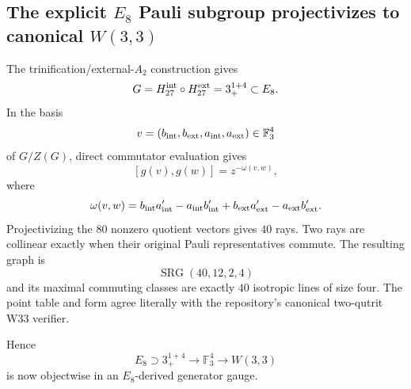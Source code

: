 \subsection*{The explicit $E_8$ Pauli subgroup projectivizes to canonical $W(3,3)$}
The trinification/external-$A_2$ construction gives
\[
G=H_{27}^{\rm int}\circ H_{27}^{\rm ext}=3_+^{1+4}\subset E_8.
\]
In the basis
\[
v=(b_{\rm int},b_{\rm ext},a_{\rm int},a_{\rm ext})\in\mathbb F_3^4
\]
of \(G/Z(G)\), direct commutator evaluation gives
\[
[g(v),g(w)]=z^{-\omega(v,w)},
\]
where
\[
\omega(v,w)=b_{\rm int}a'_{\rm int}-a_{\rm int}b'_{\rm int}
+b_{\rm ext}a'_{\rm ext}-a_{\rm ext}b'_{\rm ext}.
\]
Projectivizing the \(80\) nonzero quotient vectors gives \(40\) rays. Two rays are collinear exactly when their original Pauli representatives commute. The resulting graph is
\[
\operatorname{SRG}(40,12,2,4)
\]
and its maximal commuting classes are exactly \(40\) isotropic lines of size four. The point table and form agree literally with the repository's canonical two-qutrit W33 verifier.

Hence
\[
\boxed{E_8\supset3_+^{1+4}\to\mathbb F_3^4\to W(3,3)}
\]
is now objectwise in an \(E_8\)-derived generator gauge.

